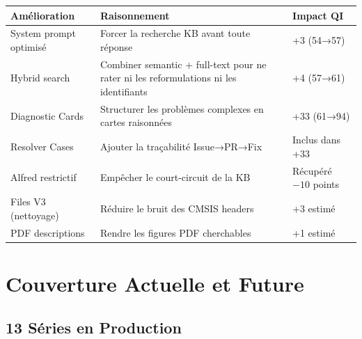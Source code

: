 \documentclass[12pt,a4paper]{report}
\begin{document}
\begin{longtable}{p{4cm}p{5cm}p{4cm}}
\toprule
\textbf{Amélioration} & \textbf{Raisonnement} & \textbf{Impact QI} \\
\midrule
System prompt optimisé & Forcer la recherche KB avant toute réponse & +3 (54→57) \\
Hybrid search & Combiner semantic + full-text pour ne rater ni les reformulations ni les identifiants & +4 (57→61) \\
Diagnostic Cards & Structurer les problèmes complexes en cartes raisonnées & +33 (61→94) \\
Resolver Cases & Ajouter la traçabilité Issue→PR→Fix & Inclus dans +33 \\
Alfred restrictif & Empêcher le court-circuit de la KB & Récupéré $-10$ points \\
Files V3 (nettoyage) & Réduire le bruit des CMSIS headers & +3 estimé \\
PDF descriptions & Rendre les figures PDF cherchables & +1 estimé \\
\bottomrule
\end{longtable}

\section{Couverture Actuelle et Future}

\subsection{13 Séries en Production}
\end{document}

